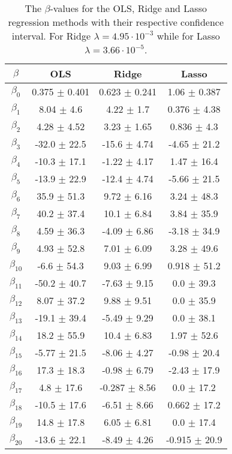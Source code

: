 \documentclass[uio,jmp,amsmath,amssymb,reprint,nofootinbib]{revtex4-1}
\numberwithin{equation}{section}
\begin{document}
\begin{table}
\begin{tabular}{|c|c|c|c|}\hline
\(\beta\) & OLS & Ridge & Lasso \\ \hline
\(\beta_{0}\) & 0.375 \(\pm\) 0.401 & 0.623 \(\pm\) 0.241 & 1.06 \(\pm\) 0.387 \\ \hline
\(\beta_{1}\) & 8.04 \(\pm\) 4.6 & 4.22 \(\pm\) 1.7 & 0.376 \(\pm\) 4.38 \\ \hline
\(\beta_{2}\) & 4.28 \(\pm\) 4.52 & 3.23 \(\pm\) 1.65 & 0.836 \(\pm\) 4.3 \\ \hline
\(\beta_{3}\) & -32.0 \(\pm\) 22.5 & -15.6 \(\pm\) 4.74 & -4.65 \(\pm\) 21.2 \\ \hline
\(\beta_{4}\) & -10.3 \(\pm\) 17.1 & -1.22 \(\pm\) 4.17 & 1.47 \(\pm\) 16.4 \\ \hline
\(\beta_{5}\) & -13.9 \(\pm\) 22.9 & -12.4 \(\pm\) 4.74 & -5.66 \(\pm\) 21.5 \\ \hline
\(\beta_{6}\) & 35.9 \(\pm\) 51.3 & 9.72 \(\pm\) 6.16 & 3.24 \(\pm\) 48.3 \\ \hline
\(\beta_{7}\) & 40.2 \(\pm\) 37.4 & 10.1 \(\pm\) 6.84 & 3.84 \(\pm\) 35.9 \\ \hline
\(\beta_{8}\) & 4.59 \(\pm\) 36.3 & -4.09 \(\pm\) 6.86 & -3.18 \(\pm\) 34.9 \\ \hline
\(\beta_{9}\) & 4.93 \(\pm\) 52.8 & 7.01 \(\pm\) 6.09 & 3.28 \(\pm\) 49.6 \\ \hline
\(\beta_{10}\) & -6.6 \(\pm\) 54.3 & 9.03 \(\pm\) 6.99 & 0.918 \(\pm\) 51.2 \\ \hline
\(\beta_{11}\) & -50.2 \(\pm\) 40.7 & -7.63 \(\pm\) 9.15 & 0.0 \(\pm\) 39.3 \\ \hline
\(\beta_{12}\) & 8.07 \(\pm\) 37.2 & 9.88 \(\pm\) 9.51 & 0.0 \(\pm\) 35.9 \\ \hline
\(\beta_{13}\) & -19.1 \(\pm\) 39.4 & -5.49 \(\pm\) 9.29 & 0.0 \(\pm\) 38.1 \\ \hline
\(\beta_{14}\) & 18.2 \(\pm\) 55.9 & 10.4 \(\pm\) 6.83 & 1.97 \(\pm\) 52.6 \\ \hline
\(\beta_{15}\) & -5.77 \(\pm\) 21.5 & -8.06 \(\pm\) 4.27 & -0.98 \(\pm\) 20.4 \\ \hline
\(\beta_{16}\) & 17.3 \(\pm\) 18.3 & -0.98 \(\pm\) 6.79 & -2.43 \(\pm\) 17.9 \\ \hline
\(\beta_{17}\) & 4.8 \(\pm\) 17.6 & -0.287 \(\pm\) 8.56 & 0.0 \(\pm\) 17.2 \\ \hline
\(\beta_{18}\) & -10.5 \(\pm\) 17.6 & -6.51 \(\pm\) 8.66 & 0.662 \(\pm\) 17.2 \\ \hline
\(\beta_{19}\) & 14.8 \(\pm\) 17.8 & 6.05 \(\pm\) 6.81 & 0.0 \(\pm\) 17.4 \\ \hline
\(\beta_{20}\) & -13.6 \(\pm\) 22.1 & -8.49 \(\pm\) 4.26 & -0.915 \(\pm\) 20.9 \\ \hline
\end{tabular}
\caption{The \(\beta\)-values for the OLS, Ridge and Lasso regression methods with their respective confidence interval. For Ridge \(\lambda = 4.95\cdot 10^{-3}\) while for Lasso \(\lambda = 3.66\cdot 10^{-5}\).}
\label{tab:01}
\end{table}
\end{document}
